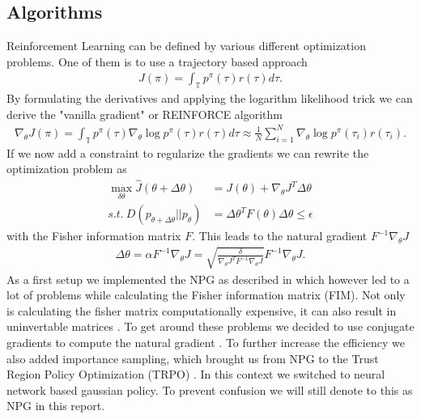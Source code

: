 \subsection{Algorithms}
\label{algos}
Reinforcement Learning can be defined by various different optimization problems. One of them is to use a trajectory based approach
\begin{align}
  J(\pi) = \int_{\mathbb{T}} p^{\pi}(\tau) r(\tau) d\tau.
\end{align}
By formulating the derivatives and applying the logarithm likelihood trick we can derive the "vanilla gradient" or REINFORCE algorithm \cite{Williams1992}
\begin{align}
  \nabla_{\theta} J(\pi) = \int_{\mathbb{T}} p^{\pi}(\tau) \nabla_{\theta} \log p^{\pi}(\tau) r(\tau) d\tau \approx \frac{1}{N} \sum_{i=1}^{N} \nabla_{\theta} \log p^{\pi}(\tau_i) r(\tau_i).
\end{align}
If we now add a constraint to regularize the gradients we can rewrite the optimization problem as
\begin{align}
  \max_{\delta\theta} \hat J(\theta + \Delta\theta) &= J(\theta) + \nabla_{\theta} J^T \Delta\theta \nonumber \\
  s.t. \ D(p_{\theta + \Delta\theta} || p_{\theta}) &= \Delta\theta^T F(\theta) \Delta\theta \leq \epsilon \label{NpgOpti}
\end{align}
with the Fisher information matrix $F$. This leads to the natural gradient $F^{-1} \nabla_{\theta} J$ \cite{Rajeswaran2017}
\begin{align}
  \Delta \theta = \alpha F^{-1} \nabla_{\theta} J = \sqrt{\frac{\delta}{\nabla_{\theta} J^T F^{-1} \nabla_{\theta} J}} F^{-1} \nabla_{\theta} J.
\end{align}
As a first setup we implemented the NPG as described in \cite{Rajeswaran2017} which however led to a lot of problems while calculating the Fisher information matrix (FIM). Not only is calculating the fisher matrix computationally expensive, it can also result in uninvertable matrices \cite{DuanCHSA16}. To get around these problems we decided to use conjugate gradients to compute the natural gradient \cite{DuanCHSA16}. To further increase the efficiency we also added importance sampling, which brought us from NPG to the Trust Region Policy Optimization (TRPO) \cite{SchulmanLMJA15,Telesens}. In this context we switched to neural network based gaussian policy. To prevent confusion we will still denote to this as NPG in this report.\\

